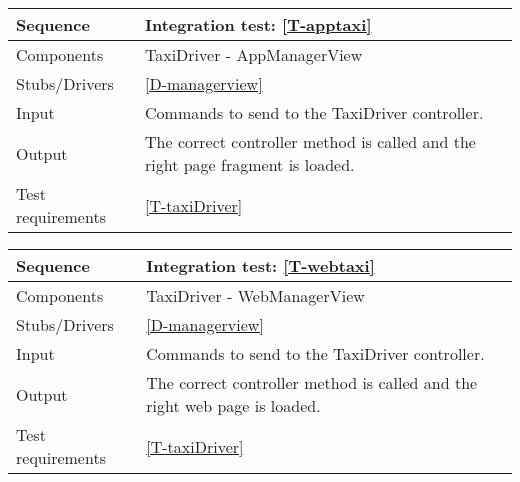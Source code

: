 \begin{table}[H]
    \begin{tabularx}{\textwidth}{l|X}
        \hline
        Sequence
        & 
        Integration test: \ref{T-apptaxi}
        \\ \hline
        Components 
        & 
        TaxiDriver - AppManagerView
        \\ \hline
        Stubs/Drivers 
        & 
        \ref{D-managerview}
        \\ \hline
        Input 
        & 
        Commands to send to the TaxiDriver controller.
        \\ \hline
        Output 
        & 
        The correct controller method is called and the right page fragment is loaded.
        \\ \hline
        Test requirements 
        & 
        \ref{T-taxiDriver}
        \\ \hline
    \end{tabularx}
\end{table}

\begin{table}[H]
    \begin{tabularx}{\textwidth}{l|X}
        \hline
        Sequence
        & 
        Integration test: \ref{T-webtaxi}
        \\ \hline
        Components 
        & 
        TaxiDriver -  WebManagerView
        \\ \hline
        Stubs/Drivers 
        & 
        \ref{D-managerview}
        \\ \hline
        Input 
        & 
        Commands to send to the TaxiDriver controller.
        \\ \hline
        Output 
        & 
        The correct controller method is called and the right web page is loaded.
        \\ \hline
        Test requirements 
        & 
        \ref{T-taxiDriver}
        \\ \hline
    \end{tabularx}
\end{table}

